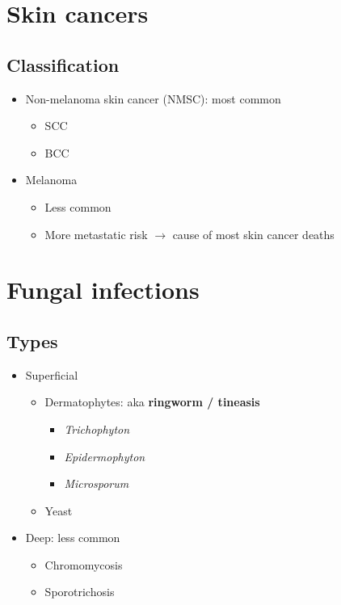 \documentclass[
  12pt,
]{memoir}
\providecommand{\tightlist}{%
  \setlength{\itemsep}{0pt}\setlength{\parskip}{0pt}}
\begin{document}
\hypertarget{skin-cancers}{%
\section{Skin cancers}\label{skin-cancers}}

\hypertarget{classification}{%
\subsection{Classification}\label{classification}}

\begin{itemize}
\tightlist
\item
  Non-melanoma skin cancer (NMSC): most common

  \begin{itemize}
  \tightlist
  \item
    SCC
  \item
    BCC
  \end{itemize}
\item
  Melanoma

  \begin{itemize}
  \tightlist
  \item
    Less common
  \item
    More metastatic risk \(\rightarrow\) cause of most skin cancer
    deaths
  \end{itemize}
\end{itemize}

\hypertarget{fungal-infections}{%
\section{Fungal infections}\label{fungal-infections}}

\hypertarget{types}{%
\subsection{Types}\label{types}}

\begin{itemize}
\tightlist
\item
  Superficial

  \begin{itemize}
  \tightlist
  \item
    Dermatophytes: aka \textbf{ringworm / tineasis}

    \begin{itemize}
    \tightlist
    \item
      \emph{Trichophyton}
    \item
      \emph{Epidermophyton}
    \item
      \emph{Microsporum}
    \end{itemize}
  \item
    Yeast
  \end{itemize}
\item
  Deep: less common

  \begin{itemize}
  \tightlist
  \item
    Chromomycosis
  \item
    Sporotrichosis
  \end{itemize}
\end{itemize}
\end{document}
